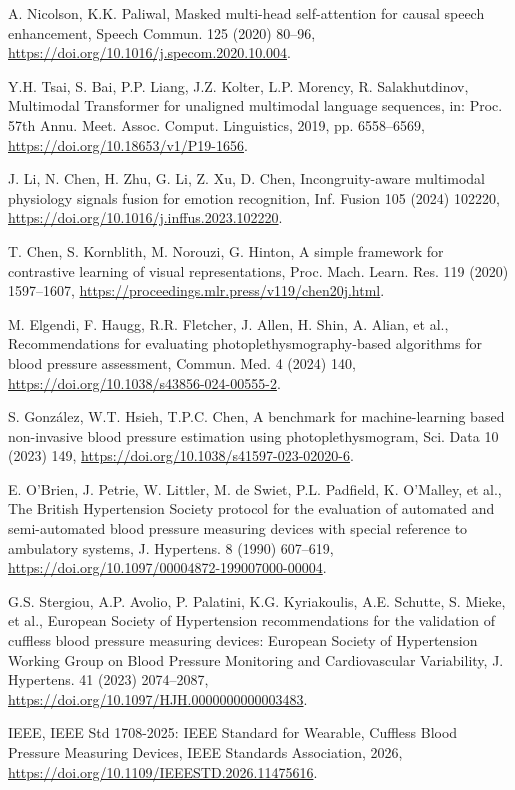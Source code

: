 \documentclass[preprint,12pt]{elsarticle}
\begin{document}
\begin{enumerate}[label={[\arabic*]},leftmargin=2.2em]
\item A. Nicolson, K.K. Paliwal, Masked multi-head self-attention for causal speech enhancement, Speech Commun. 125 (2020) 80--96, \url{https://doi.org/10.1016/j.specom.2020.10.004}.
\item Y.H. Tsai, S. Bai, P.P. Liang, J.Z. Kolter, L.P. Morency, R. Salakhutdinov, Multimodal Transformer for unaligned multimodal language sequences, in: Proc. 57th Annu. Meet. Assoc. Comput. Linguistics, 2019, pp. 6558--6569, \url{https://doi.org/10.18653/v1/P19-1656}.
\item J. Li, N. Chen, H. Zhu, G. Li, Z. Xu, D. Chen, Incongruity-aware multimodal physiology signals fusion for emotion recognition, Inf. Fusion 105 (2024) 102220, \url{https://doi.org/10.1016/j.inffus.2023.102220}.
\item T. Chen, S. Kornblith, M. Norouzi, G. Hinton, A simple framework for contrastive learning of visual representations, Proc. Mach. Learn. Res. 119 (2020) 1597--1607, \url{https://proceedings.mlr.press/v119/chen20j.html}.
\item M. Elgendi, F. Haugg, R.R. Fletcher, J. Allen, H. Shin, A. Alian, et al., Recommendations for evaluating photoplethysmography-based algorithms for blood pressure assessment, Commun. Med. 4 (2024) 140, \url{https://doi.org/10.1038/s43856-024-00555-2}.
\item S. Gonz{\'a}lez, W.T. Hsieh, T.P.C. Chen, A benchmark for machine-learning based non-invasive blood pressure estimation using photoplethysmogram, Sci. Data 10 (2023) 149, \url{https://doi.org/10.1038/s41597-023-02020-6}.
\item E. O'Brien, J. Petrie, W. Littler, M. de Swiet, P.L. Padfield, K. O'Malley, et al., The British Hypertension Society protocol for the evaluation of automated and semi-automated blood pressure measuring devices with special reference to ambulatory systems, J. Hypertens. 8 (1990) 607--619, \url{https://doi.org/10.1097/00004872-199007000-00004}.
\item G.S. Stergiou, A.P. Avolio, P. Palatini, K.G. Kyriakoulis, A.E. Schutte, S. Mieke, et al., European Society of Hypertension recommendations for the validation of cuffless blood pressure measuring devices: European Society of Hypertension Working Group on Blood Pressure Monitoring and Cardiovascular Variability, J. Hypertens. 41 (2023) 2074--2087, \url{https://doi.org/10.1097/HJH.0000000000003483}.
\item IEEE, IEEE Std 1708-2025: IEEE Standard for Wearable, Cuffless Blood Pressure Measuring Devices, IEEE Standards Association, 2026, \url{https://doi.org/10.1109/IEEESTD.2026.11475616}.

\end{enumerate}
\end{document}

